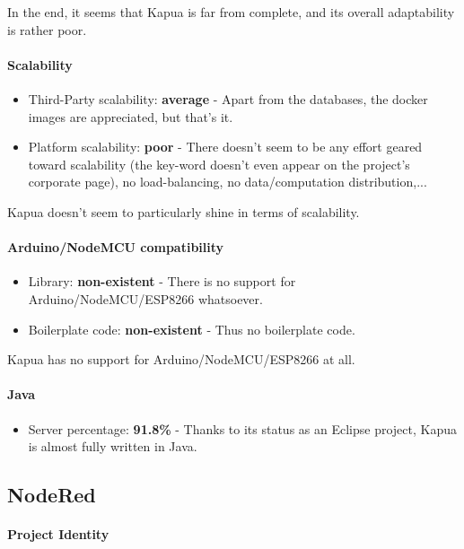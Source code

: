 \documentclass{article}
\begin{document}
In the end, it seems that Kapua is far from complete, and its overall adaptability is rather poor.

\paragraph{Scalability}

\begin{itemize}
\item Third-Party scalability: \textbf{average} - Apart from the databases, the docker images are appreciated, but that's it.
\item Platform scalability: \textbf{poor} - There doesn't seem to be any effort geared toward scalability (the key-word doesn't even appear on the project's corporate page), no load-balancing, no data/computation distribution,...
\end{itemize}

Kapua doesn't seem to particularly shine in terms of scalability.

\paragraph{Arduino/NodeMCU compatibility}

\begin{itemize}
\item Library: \textbf{non-existent} - There is no support for Arduino/NodeMCU/ESP8266 whatsoever.
\item Boilerplate code: \textbf{non-existent} - Thus no boilerplate code.
\end{itemize}

Kapua has no support for Arduino/NodeMCU/ESP8266 at all.

\paragraph{Java}

\begin{itemize}
\item Server percentage: \textbf{91.8\%} - Thanks to its status as an Eclipse project, Kapua is almost fully written in Java.
\end{itemize}

\subsection{NodeRed}

\paragraph{Project Identity}
\end{document}
